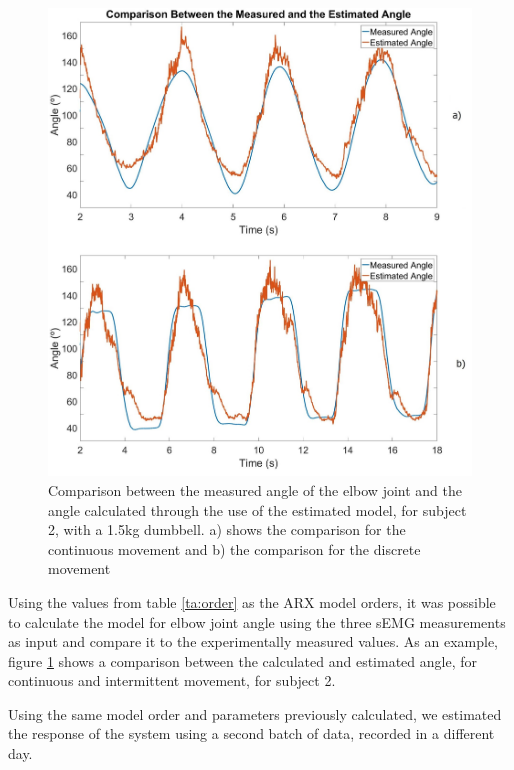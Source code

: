 \documentclass[letterpaper, 10 pt, conference]{ieeeconf}  %
\begin{document}
\begin{figure}[thpb]
      \centering
      \includegraphics[width=\columnwidth]{Images/comparison.jpg}
      \caption{Comparison between the measured angle of the elbow joint and the angle calculated through the use of the estimated model, for subject 2, with a 1.5kg dumbbell. a) shows the comparison for the continuous movement and b) the comparison for the discrete movement}
      \label{Angle Comparison}
   \end{figure}
   


Using the values from table \ref{ta:order} as the ARX model orders, it was possible to calculate the model for elbow joint angle using the three sEMG measurements as input and compare it to the experimentally measured values. As an example, figure \ref{Angle Comparison} shows a comparison between the calculated and estimated angle, for continuous and intermittent movement, for subject 2.

Using the same model order and parameters previously calculated, we estimated the response of the system using a second batch of data, recorded in a different day. %
\end{document}
